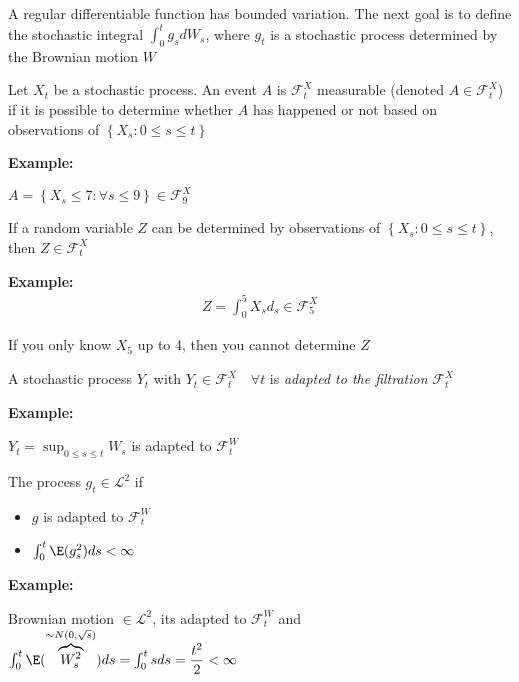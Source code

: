 \par\bigskip
\noindent A regular differentiable function has bounded variation. The next goal is to define the stochastic integral $\int_{0}^{t}g_sdW_s$, where $g_t$ is a stochastic process determined by the Brownian motion $W$
\par\bigskip
\begin{defo}{}
Let $X_t$ be a stochastic process. An event $A$ is $\mathcal{F}_t^X$ measurable (denoted $A\in\mathcal{F}_t^X$) if it is possible to determine whether $A$ has happened or not based on observations of $\left\{X_s:0\leq s\leq t\right\}$
\end{defo}
\par\bigskip
\noindent\textbf{Example:}\par
\noindent $A = \left\{X_s\leq 7:\forall s\leq9\right\}\in\mathcal{F}_9^X$
\par\bigskip
\begin{defo}[]{}
If a random variable $Z$ can be determined by observations of $\left\{X_s:0\leq s\leq t\right\}$, then $Z\in\mathcal{F}_t^X$
\end{defo}
\par\bigskip
\noindent\textbf{Example:}
\begin{equation*}
  \begin{gathered}
    Z = \int_{0}^{5}X_sd_s\in\mathcal{F}_5^X
  \end{gathered}
\end{equation*}\par
\noindent If you only know $X_5$ up to 4, then you cannot determine $Z$
\par\bigskip
\begin{defo}[]{}
  A stochastic process $Y_t$ with $Y_t\in\mathcal{F}_t^X\quad\forall t$ is \textit{adapted to the filtration} $\mathcal{F}_t^X$
\end{defo}
\par\bigskip
\noindent\textbf{Example:}\par
\noindent $Y_t = \sup_{0\leq s\leq t}W_s$ is adapted to $\mathcal{F}_t^W$
\par\bigskip
\begin{defo}[]{}
  The process $g_t\in\mathcal{L}^2$ if\par
  \begin{itemize}
    \item $g$ is adapted to $\mathcal{F}_t^W$
    \item $\int_{0}^{t}\E(g_s^2)ds<\infty$
  \end{itemize}
\end{defo}
\par\bigskip
\noindent\textbf{Example:}\par
\noindent Brownian motion $\in\mathcal{L}^2$, its adapted to $\mathcal{F}_t^W$ and $\int_{0}^{t}\E(\overbrace{W_s^2}^{\sim N(0,\sqrt{s})})ds = \int_{0}^{t}sds = \dfrac{t^2}{2}<\infty$
\par\bigskip
